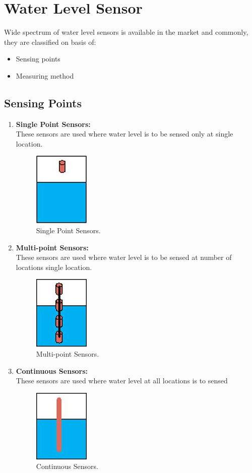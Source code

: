 \documentclass[a4paper,12pt]{report}
\begin{document}
\section{Water Level Sensor}
Wide spectrum of water level sensors is available in the market and commonly, they are classified on basis of:
\begin{itemize}
 \item Sensing points
 \item Measuring method
\end{itemize}

\subsection{Sensing Points}
\begin{enumerate}
 \item \textbf{Single Point Sensors:}\\
 These sensors are used where water level is to be sensed only at single location.
 \begin{figure}[h]
 \centering
  \includegraphics[width=.08\textwidth]{figures/wl_1.jpg}
  \caption{Single Point Sensors.}
  \label{Single Point Sensors}
 \end{figure} 
 
 \item \textbf{Multi-point Sensors:}\\
 These sensors are used where water level is to be sensed at number of locations single location.
 \begin{figure}[h]
 \centering
  \includegraphics[width=.08\textwidth]{figures/wl_2.jpg}
  \caption{Multi-point Sensors.}
  \label{Multi-point Sensors}
 \end{figure} 
 
 \item \textbf{Continuous Sensors:}\\
 These sensors are used where water level at all locations is to sensed
 \begin{figure}[h]
 \centering
  \includegraphics[width=.08\textwidth]{figures/wl_3.jpg}
  \caption{Continuous Sensors.}
  \label{Continuous Sensors}
 \end{figure} 
\end{enumerate}
\end{document}
